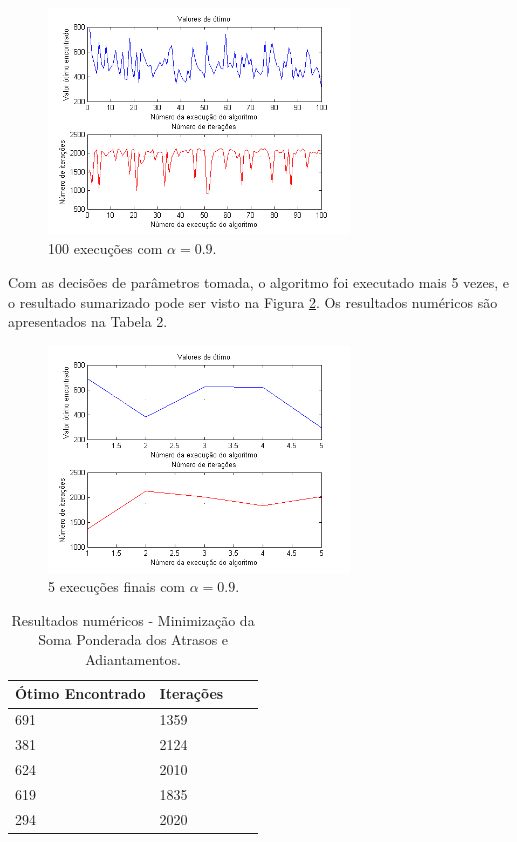 \documentclass[conference]{IEEEtran}
\begin{document}
	\begin{figure}[h]
		\centering
		\includegraphics[width=8cm]{img/mult-result-spa-3.png}
		\caption{100 execuções com $\alpha = 0.9$.}
		\label{fig:mult-result-spa-3}
	\end{figure}
	\newpage
Com as decisões de parâmetros tomada, o algoritmo foi executado mais 5 vezes, e o resultado sumarizado pode ser visto na Figura \ref{fig:mult-result-spa-4}. Os resultados numéricos são apresentados na Tabela 2.

	\begin{figure}[h]
		\centering
		\includegraphics[width=8cm]{img/mult-result-spa-4.png}
		\caption{5 execuções finais com $\alpha = 0.9$.}
		\label{fig:mult-result-spa-4}
	\end{figure}
	
	\begin{table}[h]
		\centering
		\begin{tabular}{ | l | l | l | l |}
			\hline
			Ótimo Encontrado & Iterações \\ \hline
			691 & 1359 \\ \hline
			381 & 2124 \\ \hline
			624 & 2010 \\ \hline
			619 & 1835 \\ \hline
			294 & 2020 \\ \hline
		\end{tabular}
		\label{table:result2}
		\caption{Resultados numéricos - Minimização da Soma Ponderada dos Atrasos e Adiantamentos.}
	\end{table}
	
\end{document}
